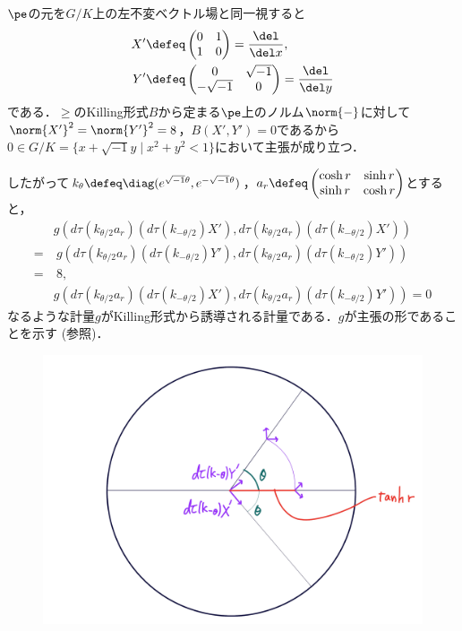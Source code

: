 \begin{npfwn}
  
  $\pe$の元を$G/K$上の左不変ベクトル場と同一視すると
  \begin{align*}
    X' &\defeq 
         \begin{pmatrix}
           0 & 1 \\ 1 & 0
         \end{pmatrix} = \dfrac{\del}{\del x},\\
    Y' &\defeq 
         \begin{pmatrix}
           0 & \sqrt{-1} \\ -\sqrt{-1} & 0
         \end{pmatrix} = \dfrac{\del}{\del y}
  \end{align*}
  である．$\ge$のKilling形式$B$から定まる$\pe$上のノルム$\norm{-} $に対して$\norm{X'}^2 = \norm{Y'}^2 = 8 $，$B(X', Y' ) = 0$であるから$0\in G/K =\{x+\sqrt{-1}y\mid x^2 + y^2 < 1 \}  $において主張が成り立つ．

  したがって$k_{\theta} \defeq \diag(e^{\sqrt{-1}\theta},e^{-\sqrt{-1}\theta}) $，$a_r\defeq
  \begin{pmatrix}
    \cosh r & \sinh r \\  \sinh r & \cosh r
  \end{pmatrix}
  $とすると，
  \begin{align*}
    &g(d\tau(k_{\theta/2}a_r)(d\tau(k_{-\theta/2})X'), d\tau(k_{\theta/2}a_r)(d\tau(k_{-\theta/2})X')) \\
    =&\ g (d\tau(k_{\theta/2}a_r)(d\tau(k_{-\theta/2})Y'), d\tau(k_{\theta/2}a_r)(d\tau(k_{-\theta/2})Y')) \\
    =&\ 8, \\
    &g(d\tau(k_{\theta/2}a_r)(d\tau(k_{-\theta/2})X'), d\tau(k_{\theta/2}a_r)(d\tau(k_{-\theta/2})Y'))  = 0
  \end{align*}
  なるような計量$g $がKilling形式から誘導される計量である．$g$が主張の形であることを示す (参照)．

  \begin{figure}[H]
    \centering
    \includegraphics[scale=0.08]{../graph/riem-su11.png}
    \caption{}
    \label{fig:riem-metric-su11}
  \end{figure}



\end{npfwn}
